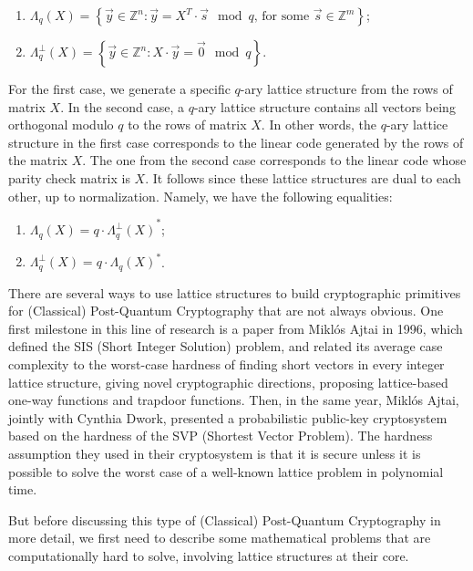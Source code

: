 \documentclass[runningheads]{llncs}
\numberwithin{equation}{section}
\begin{document}
    \begin{enumerate}
        \item ${\Lambda}_{q}(X) = \left\{ \Vec{y} \in {\mathbb{Z}}^{n}: \Vec{y} = {X}^{T} \cdot \Vec{s} \mod q\text{, for some } \Vec{s}\in {\mathbb{Z}}^{m} \right\}$;
        \item ${\Lambda}_{q}^{\perp}(X) = \left\{ \Vec{y} \in {\mathbb{Z}}^{n}: X \cdot \Vec{y} = \Vec{0} \mod q \right\}$.
    \end{enumerate}

    \noindent For the first case, we generate a specific $q$-ary lattice structure from the rows of matrix $X$. In the second case, a $q$-ary lattice structure contains all vectors being orthogonal modulo $q$ to the rows of matrix $X$. In other words, the $q$-ary lattice structure in the first case corresponds to the linear code generated by the rows of the matrix $X$. The one from the second case corresponds to the linear code whose parity check matrix is $X$. It follows since these lattice structures are dual to each other, up to normalization. Namely, we have the following equalities:
    
    \begin{enumerate}
        \item ${\Lambda}_{q}(X) = q \cdot {{\Lambda}_{q}^{\perp}(X)}^{*}$;
        \item ${\Lambda}_{q}^{\perp}(X) = q \cdot {{\Lambda}_{q}(X)}^{*}$.
    \end{enumerate}

    \noindent There are several ways to use lattice structures to build cryptographic primitives for (Classical) Post-Quantum Cryptography that are not always obvious. One first milestone in this line of research is a paper from Mikl\'{o}s Ajtai in 1996, which defined the SIS (Short Integer Solution) problem, and related its average case complexity to the worst-case hardness of finding short vectors in every integer lattice structure, giving novel cryptographic directions, proposing lattice-based one-way functions and trapdoor functions. Then, in the same year, Mikl\'{o}s Ajtai, jointly with Cynthia Dwork, presented a probabilistic public-key cryptosystem based on the hardness of the SVP (Shortest Vector Problem). The hardness assumption they used in their cryptosystem is that it is secure unless it is possible to solve the worst case of a well-known lattice problem in polynomial time.

    But before discussing this type of (Classical) Post-Quantum Cryptography in more detail, we first need to describe some mathematical problems that are computationally hard to solve, involving lattice structures at their core.
    
\end{document}
